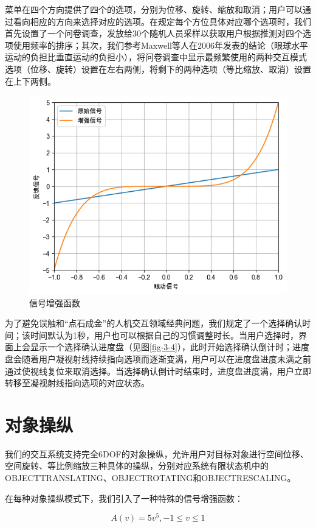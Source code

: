 菜单在四个方向提供了四个的选项，分别为位移、旋转、缩放和取消；用户可以通过看向相应的方向来选择对应的选项。在规定每个方位具体对应哪个选项时，我们首先设置了一个问卷调查，发放给30个随机人员采样以获取用户根据推测对四个选项使用频率的排序；其次，我们参考Maxwell等人在2006年发表的结论（眼球水平运动的负担比垂直运动的负担小），将问卷调查中显示最频繁使用的两种交互模式选项（位移、旋转）设置在左右两侧，将剩下的两种选项（等比缩放、取消）设置在上下两侧。

\begin{figure}[b!]
    \centering
    \includegraphics[width=.7\textwidth]{figure/augmented.png}
    \caption{信号增强函数}
    \label{fig-3-2}
\end{figure}

为了避免误触和“点石成金”的人机交互领域经典问题，我们规定了一个选择确认时间；该时间默认为1秒，用户也可以根据自己的习惯调整时长。当用户选择时，界面上会显示一个选择确认进度盘（见图\ref{fig-3-4}），此时开始选择确认倒计时；进度盘会随着用户凝视射线持续指向选项而逐渐变满，用户可以在进度盘进度未满之前通过使视线复位来取消选择。当选择确认倒计时结束时，进度盘进度满，用户立即转移至凝视射线指向选项的对应状态。

\section{对象操纵}
\label{Manipulation}

我们的交互系统支持完全6DOF的对象操纵，允许用户对目标对象进行空间位移、空间旋转、等比例缩放三种具体的操纵，分别对应系统有限状态机中的OBJECT\us TRANSLATING、OBJECT\us ROTATING和OBJECT\us RESCALING。

在每种对象操纵模式下，我们引入了一种特殊的信号增强函数：

\begin{equation}
	\label{formula-3-1}
	A(v) = 5v^{5}, -1 \le v \le 1
\end{equation}

